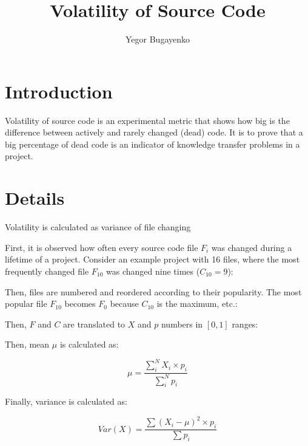 \documentclass[12pt]{article}
\begin{document}
	\setlength{\parindent}{0pt}
	\setlength{\parskip}{1em}

\title{Volatility of Source Code}
\author{Yegor Bugayenko}
\maketitle

\section{Introduction}

    Volatility of source code is an experimental metric that
    shows how big is the difference between actively and rarely changed (dead)
    code. It is to prove that a big percentage of dead code is
    an indicator of knowledge transfer problems in a project.

\section{Details}

    Volatility is calculated as variance of file changing

    First, it is observed how often every source code file $F_i$ was changed
    during a lifetime of a project. Consider an example project with 16 files,
    where the most frequently changed file $F_{10}$ was changed nine times
    ($C_{10} = 9$):

    \immediate{}
    

    Then, files are numbered and reordered according to their popularity.
    The most popular file $F_{10}$ becomes $F_0$ because $C_{10}$ is
    the maximum, etc.:

    \immediate{}
    

    Then, $F$ and $C$ are translated to $X$ and $p$ numbers in $[0, 1]$ ranges:

    \immediate{}
    

    Then, mean $\mu$ is calculated as:

        $$\mu = \frac{\displaystyle\sum\limits^N_i {X_i \times p_i}}{\displaystyle\sum\limits^N_i p_i}$$

    Finally, variance is calculated as:

        $$Var(X) = \frac{\displaystyle\sum\limits {(X_i - \mu)^2 \times p_i}}{\displaystyle\sum\limits p_i}$$
\end{document}
